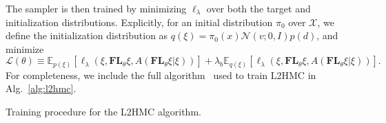 \documentclass[../main.tex]{subfiles}
\begin{document}
The sampler is then trained by minimizing $\ell_{\lambda}$ over both the target
and initialization distributions.
%
Explicitly, for an initial distribution $\pi_0$ over $\mathcal{X}$, we define
the initialization distribution as $q(\xi) = \pi_0(x) \mathcal{N}(v; 0, I)
p(d)$, and minimize
%
\begin{equation}
    \mathcal{L}(\theta)\equiv \mathbb{E}_{p(\xi)}\left[\ell_{\lambda}(\xi,
    \mathbf{FL}_{\theta}\xi, A(\mathbf{FL}_{\theta}\xi|\xi))\right] + \lambda_b
    \mathbb{E}_{q(\xi)}\left[\ell_{\lambda}(\xi, \mathbf{FL}_{\theta}\xi,
    A(\mathbf{FL}_{\theta} \xi| \xi))\right].
    \label{eq:loss_L}
\end{equation}
%
For completeness, we include the full algorithm~\cite{2017arXiv171109268L} used
to train L2HMC in Alg.~\ref{alg:l2hmc}.
%
\begin{algorithm}[htbp]%
    \AlgoDontDisplayBlockMarkers\SetAlgoNoEnd%
    \DontPrintSemicolon%
    \caption{Training procedure for the L2HMC algorithm.}%
\end{algorithm}
\end{document}

